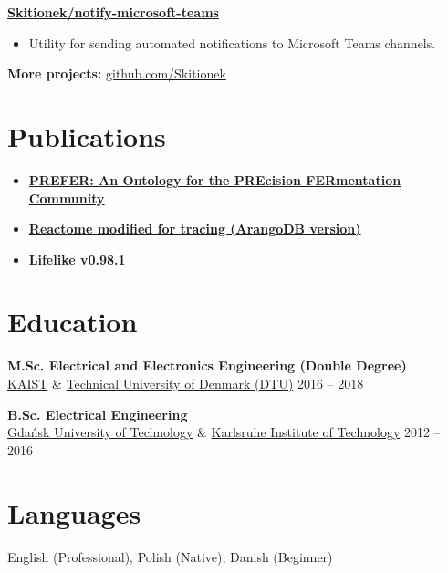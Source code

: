 \documentclass[11pt,a4paper]{article}
\begin{document}
\textbf{\href{https://github.com/Skitionek/notify-microsoft-teams}{Skitionek/notify-microsoft-teams}}
\begin{itemize}
    \item Utility for sending automated notifications to Microsoft Teams channels.
\end{itemize}

\vspace{4pt}

\textbf{More projects:} \href{https://github.com/Skitionek}{github.com/Skitionek}

\section*{Publications}
\begin{itemize}
    \item \textbf{\href{https://www.researchgate.net/publication/400970354_PREFER_An_Ontology_for_the_PREcision_FERmentation_Community}{PREFER: An Ontology for the PREcision FERmentation Community}}
    \item \textbf{\href{https://zenodo.org/records/10103768}{Reactome modified for tracing (ArangoDB version)}}
    \item \textbf{\href{https://github.com/biosustain/lifelike}{Lifelike v0.98.1}}
\end{itemize}

\section*{Education}

\textbf{M.Sc. Electrical and Electronics Engineering (Double Degree)} \\
\href{https://www.kaist.ac.kr/en/}{KAIST} \& \href{https://www.dtu.dk/english}{Technical University of Denmark (DTU)} \hfill 2016 -- 2018

\vspace{4pt}

\textbf{B.Sc. Electrical Engineering} \\
\href{https://pg.edu.pl/en}{Gdańsk University of Technology} \& \href{https://www.kit.edu/english/}{Karlsruhe Institute of Technology} \hfill 2012 -- 2016

\section*{Languages}
English (Professional), Polish (Native), Danish (Beginner)
\end{document}
